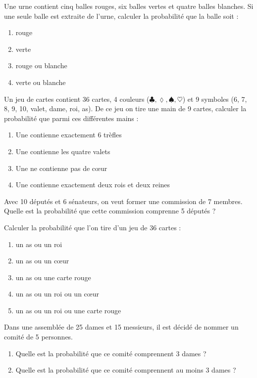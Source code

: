 \begin{exercice}
Une urne contient cinq balles rouges, six balles vertes et quatre balles blanches. Si une seule balle est extraite de l’urne, calculer la probabilité que la balle soit :
\begin{enumerate}
\item rouge
\item verte
\item rouge ou blanche
\item verte ou blanche
\end{enumerate}
\end{exercice}

\begin{exercice}
Un jeu de cartes contient 36 cartes, 4 couleurs ($\clubsuit, \lozenge, \spadesuit, \heartsuit $) et 9 symboles (6, 7, 8, 9, 10, valet, dame, roi, as). De ce jeu on tire une main de 9 cartes, calculer la probabilité que parmi ces différentes mains :
\begin{enumerate}
\item Une contienne exactement 6 trèfles
\item Une contienne les quatre valets
\item Une ne contienne pas de cœur
\item Une contienne exactement deux rois et deux reines
\end{enumerate}
\end{exercice}

\begin{exercice}Avec 10 députés et 6 sénateurs, on veut former une commission de 7 membres. Quelle est la probabilité que cette commission comprenne 5 députés ?
\end{exercice}

\begin{exercice}
Calculer la probabilité que l’on tire d’un jeu de 36 cartes :
\begin{enumerate}
\item un as ou un roi
\item un as ou un cœur	
\item un as ou une carte rouge
\item un as ou un roi ou un cœur
\item un as ou un roi ou une carte rouge
\end{enumerate}
\end{exercice}

\begin{exercice}
Dans une assemblée de 25 dames et 15 messieurs, il est décidé de nommer un comité de 5 personnes.
\begin{enumerate}
\item Quelle est la probabilité que ce comité comprennent 3 dames ?
\item Quelle est la probabilité que ce comité comprennent au moins 3 dames ?
\end{enumerate}
\end{exercice}

